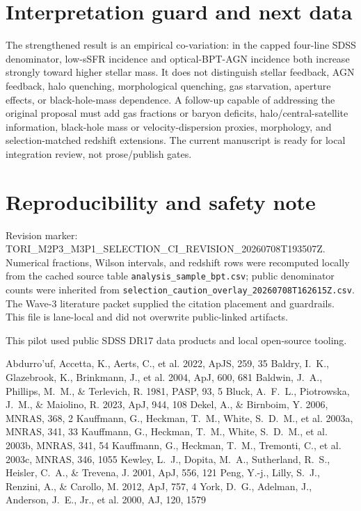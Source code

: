 \documentclass[twocolumn]{aastex631}
\begin{document}
\section{Interpretation guard and next data}
The strengthened result is an empirical co-variation: in the capped four-line SDSS denominator, low-sSFR incidence and optical-BPT-AGN incidence both increase strongly toward higher stellar mass.  It does not distinguish stellar feedback, AGN feedback, halo quenching, morphological quenching, gas starvation, aperture effects, or black-hole-mass dependence.  A follow-up capable of addressing the original proposal must add gas fractions or baryon deficits, halo/central-satellite information, black-hole mass or velocity-dispersion proxies, morphology, and selection-matched redshift extensions.  The current manuscript is ready for local integration review, not prose/publish gates.

\section*{Reproducibility and safety note}
Revision marker: TORI\_M2P3\_M3P1\_SELECTION\_CI\_REVISION\_20260708T193507Z.  Numerical fractions, Wilson intervals, and redshift rows were recomputed locally from the cached source table \texttt{analysis\_sample\_bpt.csv}; public denominator counts were inherited from \texttt{selection\_caution\_overlay\_20260708T162615Z.csv}.  The Wave-3 literature packet supplied the citation placement and guardrails.  This file is lane-local and did not overwrite public-linked artifacts.

\acknowledgments
This pilot used public SDSS DR17 data products and local open-source tooling.

\begin{thebibliography}{}
 Abdurro'uf, Accetta, K., Aerts, C., et al. 2022, ApJS, 259, 35
 Baldry, I.~K., Glazebrook, K., Brinkmann, J., et al. 2004, ApJ, 600, 681
 Baldwin, J.~A., Phillips, M.~M., \& Terlevich, R. 1981, PASP, 93, 5
 Bluck, A.~F.~L., Piotrowska, J.~M., \& Maiolino, R. 2023, ApJ, 944, 108
 Dekel, A., \& Birnboim, Y. 2006, MNRAS, 368, 2
 Kauffmann, G., Heckman, T.~M., White, S.~D.~M., et al. 2003a, MNRAS, 341, 33
 Kauffmann, G., Heckman, T.~M., White, S.~D.~M., et al. 2003b, MNRAS, 341, 54
 Kauffmann, G., Heckman, T.~M., Tremonti, C., et al. 2003c, MNRAS, 346, 1055
 Kewley, L.~J., Dopita, M.~A., Sutherland, R.~S., Heisler, C.~A., \& Trevena, J. 2001, ApJ, 556, 121
 Peng, Y.-j., Lilly, S.~J., Renzini, A., \& Carollo, M. 2012, ApJ, 757, 4
 York, D.~G., Adelman, J., Anderson, J.~E., Jr., et al. 2000, AJ, 120, 1579
\end{thebibliography}
\end{document}

